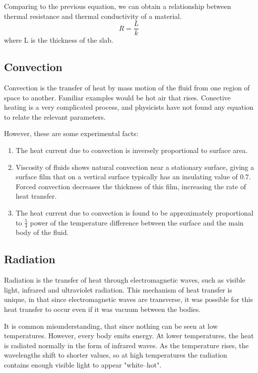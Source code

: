 Comparing to the previous equation, we can obtain a relationship between thermal resistance and thermal conductivity of a material.
$$R=\frac{L}{k}$$
where L is the thickness of the slab.
\subsection{Convection}
Convection is the transfer of heat by mass motion of the fluid from one region of space to another. Familiar examples would be hot air that rises. Conective heating is a very complicated process, and physicists have not found any equation to relate the relevant parameters.

However, these are some experimental facts:
\begin{enumerate}
\item The heat current due to convection is inversely proportional to surface area.
\item Viscosity of fluids shows natural convection near a stationary surface, giving a surface film that on a vertical surface typically has an insulating value of 0.7. Forced convection decreases the thickness of this film, increasing the rate of heat transfer.
\item The heat current due to convection is found to be approximately proportional to $\frac{5}{4}$ power of the temperature difference between the surface and the main body of the fluid.
\end{enumerate}
\subsection{Radiation}
Radiation is the transfer of heat through electromagnetic waves, such as visible light, infrared and ultraviolet radiation. This mechanism of heat transfer is unique, in that since electromagnetic waves are transverse, it was possible for this heat transfer to occur even if it was vacuum between the bodies.

It is common misunderstanding, that since nothing can be seen at low temperatures. However, every body emits energy. At lower temperatures, the heat is radiated normally in the form of infrared waves. As the temperature rises, the wavelengths shift to shorter values, so at high temperatures the radiation contains enough visible light to appear "white--hot".

